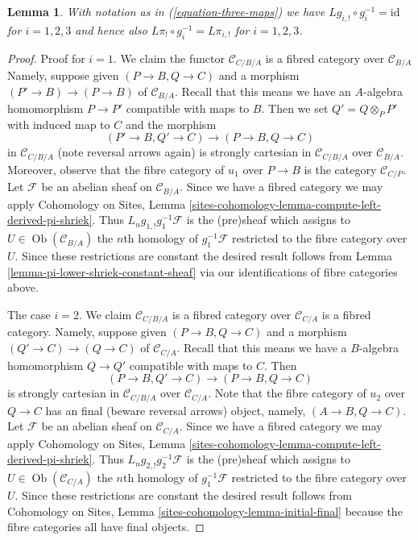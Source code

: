 \documentclass{stacks-project}
\theoremstyle{plain}
\newtheorem{lemma}[subsection]{Lemma}
\theoremstyle{definition}
\theoremstyle{remark}
\numberwithin{equation}{subsection}
\def\Ob{\mathop{\mathrm{Ob}}\nolimits}
\begin{document}
\begin{lemma}
\label{lemma-triangle-compute-lower-shriek}
With notation as in (\ref{equation-three-maps}) we have
$Lg_{i, !} \circ g_i^{-1} = \text{id}$ for $i = 1, 2, 3$
and hence also $L\pi_! \circ g_i^{-1} = L\pi_{i, !}$ for
$i = 1, 2, 3$.
\end{lemma}

\begin{proof}
Proof for $i = 1$. We claim the functor $\mathcal{C}_{C/B/A}$
is a fibred category over $\mathcal{C}_{B/A}$
Namely, suppose given $(P \to B, Q \to C)$
and a morphism $(P' \to B) \to (P \to B)$ of $\mathcal{C}_{B/A}$.
Recall that this means we have an $A$-algebra homomorphism
$P \to P'$ compatible with maps to $B$. Then we set $Q' = Q \otimes_P P'$
with induced map to $C$ and the morphism
$$
(P' \to B, Q' \to C) \longrightarrow (P \to B, Q \to C)
$$
in $\mathcal{C}_{C/B/A}$ (note reversal arrows again) is strongly cartesian
in $\mathcal{C}_{C/B/A}$ over $\mathcal{C}_{B/A}$. Moreover, observe
that the fibre category of $u_1$ over $P \to B$ is the category
$\mathcal{C}_{C/P}$. Let $\mathcal{F}$ be an abelian sheaf on
$\mathcal{C}_{B/A}$. Since we have a fibred category we may apply
Cohomology on Sites, Lemma
\ref{sites-cohomology-lemma-compute-left-derived-pi-shriek}.
Thus $L_ng_{1, !}g_1^{-1}\mathcal{F}$ is the (pre)sheaf
which assigns to $U \in \Ob(\mathcal{C}_{B/A})$ the $n$th homology of
$g_1^{-1}\mathcal{F}$ restricted to the fibre category over $U$.
Since these restrictions are constant the desired result follows from
Lemma \ref{lemma-pi-lower-shriek-constant-sheaf}
via our identifications of fibre categories above.

\medskip\noindent
The case $i = 2$.
We claim $\mathcal{C}_{C/B/A}$ is a fibred category over $\mathcal{C}_{C/A}$
is a fibred category. Namely, suppose given $(P \to B, Q \to C)$
and a morphism $(Q' \to C) \to (Q \to C)$ of $\mathcal{C}_{C/A}$.
Recall that this means we have a $B$-algebra homomorphism
$Q \to Q'$ compatible with maps to $C$. Then
$$
(P \to B, Q' \to C) \longrightarrow (P \to B, Q \to C)
$$
is strongly cartesian in $\mathcal{C}_{C/B/A}$ over $\mathcal{C}_{C/A}$.
Note that the fibre category of $u_2$ over $Q \to C$ has an final
(beware reversal arrows) object, namely, $(A \to B, Q \to C)$. Let
$\mathcal{F}$ be an abelian sheaf on $\mathcal{C}_{C/A}$.
Since we have a fibred category we may apply
Cohomology on Sites, Lemma
\ref{sites-cohomology-lemma-compute-left-derived-pi-shriek}.
Thus $L_ng_{2, !}g_2^{-1}\mathcal{F}$ is the (pre)sheaf
which assigns to $U \in \Ob(\mathcal{C}_{C/A})$ the $n$th homology of
$g_1^{-1}\mathcal{F}$ restricted to the fibre category over $U$.
Since these restrictions are constant the desired result follows from
Cohomology on Sites, Lemma \ref{sites-cohomology-lemma-initial-final}
because the fibre categories all have final objects.


\end{proof}
\end{document}
